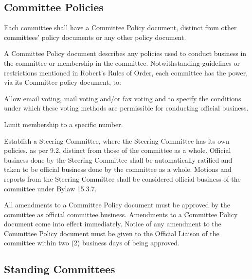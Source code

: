 \subsection{Committee Policies}
\begin{longenum}[ label*=\thesubsection.\arabic*., align=left]
	\item Each committee shall have a Committee Policy document, distinct from other committees' policy documents or any other policy document. 
    \item A Committee Policy document describes any policies used to conduct business in the committee or membership in the committee. Notwithstanding guidelines or restrictions mentioned in Robert's Rules of Order, each committee has the power, via its Committee policy document, to:
    \begin{longenum}[ label*=\arabic*., align=left]
		\item Allow email voting, mail voting and/or fax voting and to specify the conditions under which these voting methods are permissible for conducting official business.
        \item Limit membership to a specific number.
        \item Establish a Steering Committee, where the Steering Committee has its own policies, as per 9.2, distinct from those of the committee as a whole. Official business done by the Steering Committee shall be automatically ratified and taken to be official business done by the committee as a whole. Motions and reports from the Steering Committee shall be considered official business of the committee under Bylaw 15.3.7.
	\end{longenum}
   
    \item All amendments to a Committee Policy document must be approved by the committee as official committee business. Amendments to a Committee Policy document come into effect immediately. Notice of any amendment to the Committee Policy document must be given to the Official Liaison of the committee within two (2) business days of being approved.    
    
\end{longenum}
\subsection{Standing Committees}

